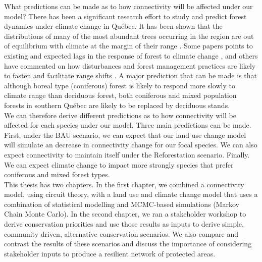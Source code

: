 \documentclass[12pt,Bold,TexShade]{thesis/mcgilletdclass}
\begin{document}
{What predictions can be made as to how connectivity will be affected under our model? There has been a significant research effort to study and predict forest dynamics under climate change in Québec. It has been shown that the distributions of many of the most abundant trees occurring in the region are out of equilibrium with climate at the margin of their range \citep{talluto_extinction_2017}. Some papers points to existing and expected lags in the response of forest to climate change \citep{savage_elevational_2015}, and others have commented on how disturbances and forest management practices are likely to fasten and facilitate range shifts \citep{leithead_northward_2010, boulanger_climate_2019, vieira_paying_2020}. A major prediction that can be made is that although boreal type (coniferous) forest is likely to respond more slowly to climate range than deciduous forest, both coniferous and mixed population forests in southern Québec are likely to be replaced by deciduous stands. \\

We can therefore derive different predictions as to how connectivity will be affected for each species under our model. Three main predictions can be made. First, under the BAU scenario, we can expect that our land use change model will simulate an decrease in connectivity change for our focal species. We can also expect connectivity to maintain itself under the Reforestation scenario. Finally. We can expect climate change to impact more strongly species that prefer coniferous  and mixed forest types. \\

This thesis has two chapters.  In the first chapter, we combined a connectivity model, using circuit theory, with a land use and climate change model that uses a combination of statistical modelling and MCMC-based simulations (Markov Chain Monte Carlo). In the second chapter, we ran a stakeholder workshop to derive conservation priorities and use those results as inputs to derive simple, community driven, alternative conservation scenarios. We also compare and contrast the results of these scenarios and discuss the importance of considering stakeholder inputs to produce a resilient network of protected areas. \\
}%
\Intro


\end{document}
